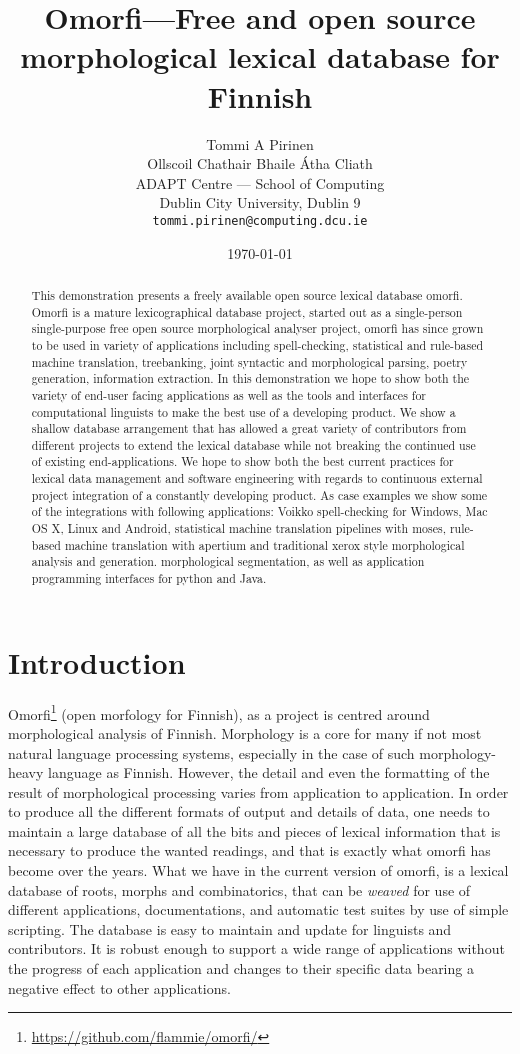 \documentclass[11pt]{article}
\title{Omorfi---Free and open source morphological lexical database for Finnish}
\author{Tommi A Pirinen \\
  Ollscoil Chathair Bhaile Átha Cliath \\
  ADAPT Centre --- School of Computing \\
  Dublin City University, Dublin 9 \\
  {\tt tommi.pirinen@computing.dcu.ie}  \\}
\date{\today}
\begin{document}
\maketitle
\begin{abstract}
    This demonstration presents a freely available open source lexical database
    omorfi. Omorfi is a mature lexicographical database project, started out as
    a single-person single-purpose free open source morphological analyser
    project, omorfi has since grown to be used in variety of applications
    including spell-checking, statistical and rule-based machine translation,
    treebanking, joint syntactic and morphological parsing, poetry generation,
    information extraction. In this demonstration we hope to show both the
    variety of end-user facing applications as well as the tools and interfaces
    for computational linguists to make the best use of a developing product.
    We show a shallow database arrangement that has allowed a great variety
    of contributors from different projects to extend the lexical database
    while not breaking the continued use of existing end-applications.
    We hope to show both the best current practices for lexical data management
    and software engineering with regards to continuous external project
    integration of a constantly developing product. As case examples we show
    some of the integrations with following applications: Voikko spell-checking
    for Windows, Mac OS X, Linux and Android, statistical machine translation
    pipelines with moses, rule-based machine translation with apertium and
    traditional xerox style morphological analysis and generation. 
    morphological segmentation, as well
    as application programming interfaces for python and Java.
\end{abstract}

\section{Introduction}

Omorfi\footnote{\url{https://github.com/flammie/omorfi/}} (open morfology for
Finnish), as a project is centred around morphological analysis of Finnish.
Morphology is a core for many if not most natural language processing systems,
especially in the case of such morphology-heavy language as Finnish.  However,
the detail and even the formatting of the result of morphological processing
varies from application to application.  In order to produce all the different
formats of output and details of data, one needs to maintain a large database
of all the bits and pieces of lexical information that is necessary to produce
the wanted readings, and that is exactly what omorfi has become over the years.
What we have in the current version of omorfi, is a lexical database of roots,
morphs and combinatorics, that can be \emph{weaved} for use of different
applications, documentations, and automatic test suites by use of simple
scripting.  The database is easy to maintain and update for linguists and
contributors. It is robust enough to support a wide range of applications
without the progress of each application and changes to their specific data
bearing a negative effect to other applications.
\end{document}
